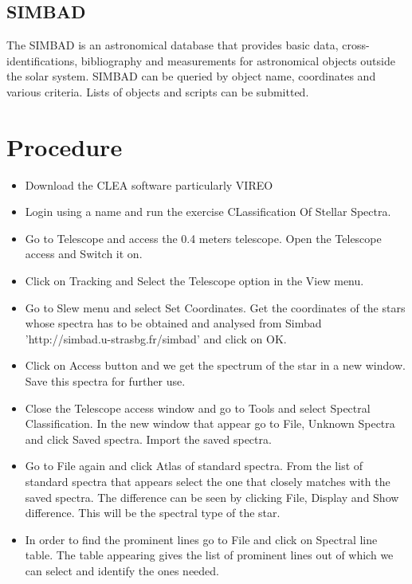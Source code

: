 \documentclass[letterpaper,11pt]{report}
\begin{document}
\subsection{SIMBAD}
The SIMBAD is an astronomical database that provides basic data, cross-identifications, bibliography
and measurements for astronomical objects outside the solar system. SIMBAD can be queried by object
name, coordinates and various criteria. Lists of objects and scripts can be submitted.

\section{Procedure}

\begin{itemize}
    \item Download the CLEA software particularly VIREO
    \item Login using a name and run the exercise CLassification Of Stellar Spectra.
    \item Go to Telescope and access the 0.4 meters telescope. Open the Telescope access and Switch it on.
    \item Click on Tracking and Select the Telescope option in the View menu.
    \item Go to Slew menu and select Set Coordinates. Get the coordinates of the stars whose spectra has to be
        obtained and analysed from Simbad ’http://simbad.u-strasbg.fr/simbad’ and click on OK.
    \item Click on Access button and we get the spectrum of the star in a new window. Save this spectra for further
        use.
    \item Close the Telescope access window and go to Tools and select Spectral Classification. In the new window
        that appear go to File, Unknown Spectra and click Saved spectra. Import the saved spectra.
    \item Go to File again and click Atlas of standard spectra. From the list of standard spectra that appears select
        the one that closely matches with the saved spectra. The difference can be seen by clicking File, Display
        and Show difference. This will be the spectral type of the star.
    \item In order to find the prominent lines go to File and click on Spectral line table. The table appearing gives
        the list of prominent lines out of which we can select and identify the ones needed.
\end{itemize}
\end{document}

